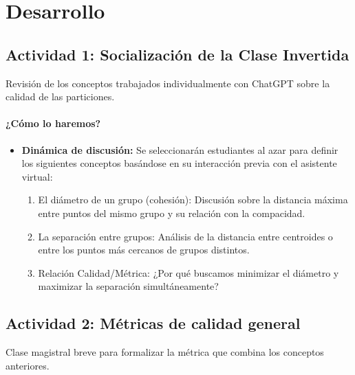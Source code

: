 \documentclass[a4,11pt]{aleph-notas}
\begin{document}
\section*{Desarrollo}

\subsection*{Actividad 1: Socialización de la Clase Invertida}

Revisión de los conceptos trabajados individualmente con ChatGPT sobre la calidad de las particiones.

\paragraph{¿Cómo lo haremos?}  

\begin{itemize}[leftmargin=*]
\item \textbf{Dinámica de discusión:}  
Se seleccionarán estudiantes al azar para definir los siguientes conceptos basándose en su interacción previa con el asistente virtual:
\begin{enumerate}[leftmargin=*]
    \item {El diámetro de un grupo (cohesión):} 
    Discusión sobre la distancia máxima entre puntos del mismo grupo y su relación con la compacidad.
    
    \item {La separación entre grupos:} 
    Análisis de la distancia entre centroides o entre los puntos más cercanos de grupos distintos.
    
    \item {Relación Calidad/Métrica:}
    ¿Por qué buscamos minimizar el diámetro y maximizar la separación simultáneamente?
\end{enumerate}
\end{itemize}

\subsection*{Actividad 2: Métricas de calidad general}

Clase magistral breve para formalizar la métrica que combina los conceptos anteriores.
\end{document}
